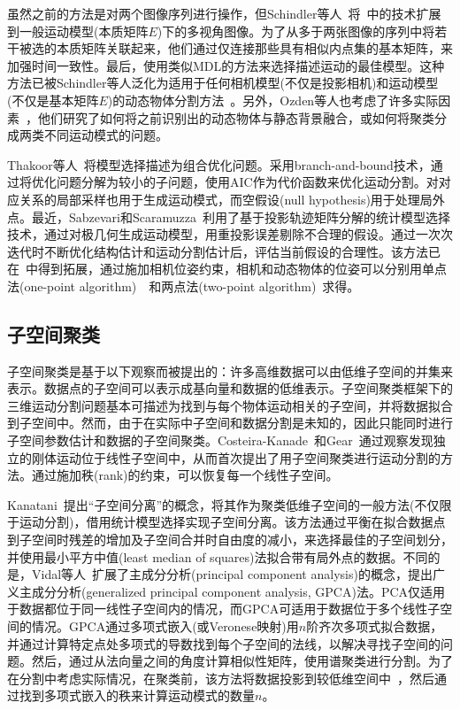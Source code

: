 虽然之前的方法是对两个图像序列进行操作，但Schindler等人~\cite{schindler2006perspective}将~\cite{schindler2005two}中的技术扩展到一般运动模型(本质矩阵$E$)下的多视角图像。为了从多于两张图像的序列中将若干被选的本质矩阵关联起来，他们通过仅连接那些具有相似内点集的基本矩阵，来加强时间一致性。最后，使用类似MDL的方法来选择描述运动的最佳模型。这种方法已被Schindler等人泛化为适用于任何相机模型(不仅是投影相机)和运动模型(不仅是基本矩阵$E$)的动态物体分割方法~\cite{schindler2008model}。另外，Ozden等人也考虑了许多实际因素~\cite{ozden2010multibody}，他们研究了如何将之前识别出的动态物体与静态背景融合，或如何将聚类分成两类不同运动模式的问题。

Thakoor等人~\cite{thakoor2010multibody}将模型选择描述为组合优化问题。采用branch-and-bound技术，通过将优化问题分解为较小的子问题，使用AIC作为代价函数来优化运动分割。对对应关系的局部采样也用于生成运动模式，而空假设(null hypothesis)用于处理局外点。最近，Sabzevari和Scaramuzza~\cite{sabzevari2014monocular}利用了基于投影轨迹矩阵分解的统计模型选择技术，通过对极几何生成运动模型，用重投影误差剔除不合理的假设。通过一次次迭代时不断优化结构估计和运动分割估计后，评估当前假设的合理性。该方法已在~\cite{sabzevari2016multiA}中得到拓展，通过施加相机位姿约束，相机和动态物体的位姿可以分别用单点法(one-point algorithm)~\cite{scaramuzza20111A}~\cite{scaramuzza2009realA}和两点法(two-point algorithm)~\cite{ortin2001indoor}求得。

\subsection{子空间聚类}
子空间聚类是基于以下观察而被提出的：许多高维数据可以由低维子空间的并集来表示。数据点的子空间可以表示成基向量和数据的低维表示。子空间聚类框架下的三维运动分割问题基本可描述为找到与每个物体运动相关的子空间，并将数据拟合到子空间中。然而，由于在实际中子空间和数据分割是未知的，因此只能同时进行子空间参数估计和数据的子空间聚类。Costeira-Kanade~\cite{costeira1998multibody}和Gear~\cite{gear1998multibody}通过观察发现独立的刚体运动位于线性子空间中，从而首次提出了用子空间聚类进行运动分割的方法。通过施加秩(rank)的约束，可以恢复每一个线性子空间。

Kanatani~\cite{kanatani2001motionA}提出“子空间分离”的概念，将其作为聚类低维子空间的一般方法(不仅限于运动分割)，借用统计模型选择实现子空间分离。该方法通过平衡在拟合数据点到子空间时残差的增加及子空间合并时自由度的减小，来选择最佳的子空间划分，并使用最小平方中值(least median of squares)法拟合带有局外点的数据。不同的是，Vidal等人~\cite{vidal2005generalized}扩展了主成分分析(principal component analysis)的概念，提出广义主成分分析(generalized principal component analysis, GPCA)法。PCA仅适用于数据都位于同一线性子空间内的情况，而GPCA可适用于数据位于多个线性子空间的情况。GPCA通过多项式嵌入(或Veronese映射)用$n$阶齐次多项式拟合数据，并通过计算特定点处多项式的导数找到每个子空间的法线，以解决寻找子空间的问题。然后，通过从法向量之间的角度计算相似性矩阵，使用谱聚类进行分割。为了在分割中考虑实际情况，在聚类前，该方法将数据投影到较低维空间中~\cite{vidal2005generalized}，然后通过找到多项式嵌入的秩来计算运动模式的数量$n$。

